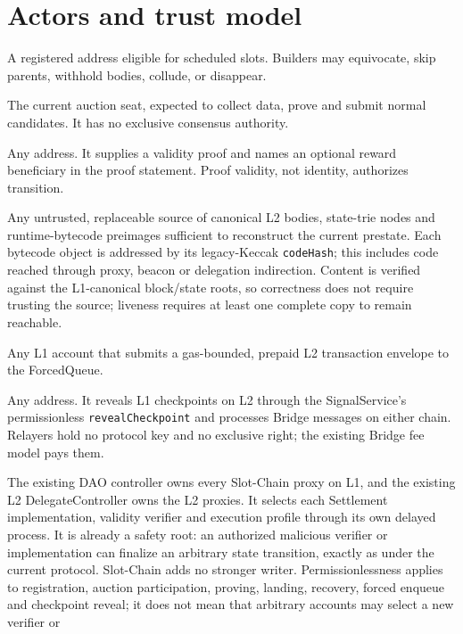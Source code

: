 \documentclass[a4paper,11pt]{article}
\newcommand{\code}[1]{\nolinkurl{#1}}
\begin{document}
\section{Actors and trust model}\label{sec:trust}

\begin{description}[style=nextline]
\item[Builder.] A registered address eligible for scheduled slots.  Builders
may equivocate, skip parents, withhold bodies, collude, or disappear.
\item[Aggregator.] The current auction seat, expected to collect data, prove and
submit normal candidates.  It has no exclusive consensus authority.
\item[Prover/lander.] Any address.  It supplies a validity proof and names an
optional reward beneficiary in the proof statement.  Proof validity, not
identity, authorizes transition.
\item[Canonical archive.] Any untrusted, replaceable source of canonical L2
bodies, state-trie nodes and runtime-bytecode preimages sufficient to
reconstruct the current prestate.  Each bytecode object is addressed by its
legacy-Keccak \code{codeHash}; this includes code reached through proxy,
beacon or delegation indirection.
Content is verified against the L1-canonical block/state roots, so correctness
does not require trusting the source; liveness requires at least one complete
copy to remain reachable.
\item[Forced-transaction sender.] Any L1 account that submits a gas-bounded,
prepaid L2 transaction envelope to the ForcedQueue.
\item[Relayer.] Any address.  It reveals L1 checkpoints on L2 through the
SignalService's permissionless \code{revealCheckpoint} and processes Bridge
messages on either chain.  Relayers hold no protocol key and no exclusive
right; the existing Bridge fee model pays them.
\item[Protocol governance.] The existing DAO controller owns every Slot-Chain
proxy on L1, and the existing L2 DelegateController owns the L2 proxies.  It
selects each Settlement implementation, validity verifier and execution
profile through its own delayed process.  It is already a safety root: an
authorized malicious verifier or implementation can finalize an arbitrary
state transition, exactly as under the current protocol.  Slot-Chain adds no
stronger writer.  Permissionlessness applies to registration, auction
participation, proving, landing, recovery, forced enqueue and checkpoint
reveal; it does not mean that arbitrary accounts may select a new verifier or

\end{description}
\end{document}
